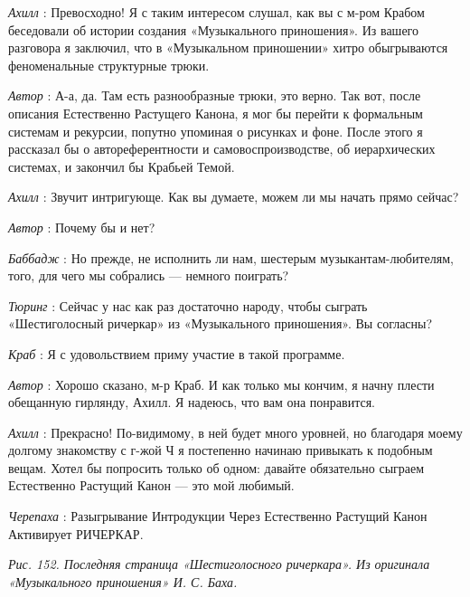 \emph{Ахилл} : Превосходно! Я с таким интересом слушал, как вы с м-ром Крабом беседовали об истории создания «Музыкального приношения». Из вашего разговора я заключил, что в «Музыкальном приношении» хитро обыгрываются феноменальные структурные трюки.

\emph{Автор} : А-а, да. Там есть разнообразные трюки, это верно. Так вот, после описания Естественно Растущего Канона, я мог бы перейти к формальным системам и рекурсии, попутно упоминая о рисунках и фоне. После этого я рассказал бы о автореферентности и самовоспроизводстве, об иерархических системах, и закончил бы Крабьей Темой.

\emph{Ахилл} : Звучит интригующе. Как вы думаете, можем ли мы начать прямо сейчас?

\emph{Автор} : Почему бы и нет?

\emph{Баббадж} : Но прежде, не исполнить ли нам, шестерым музыкантам-любителям, того, для чего мы собрались --- немного поиграть?

\emph{Тюринг} : Сейчас у нас как раз достаточно народу, чтобы сыграть «Шестиголосный ричеркар» из «Музыкального приношения». Вы согласны?

\emph{Краб} : Я с удовольствием приму участие в такой программе.

\emph{Автор} : Хорошо сказано, м-р Краб. И как только мы кончим, я начну плести обещанную гирлянду, Ахилл. Я надеюсь, что вам она понравится.

\emph{Ахилл} : Прекрасно! По-видимому, в ней будет много уровней, но благодаря моему долгому знакомству с г-жой Ч я постепенно начинаю привыкать к подобным вещам. Хотел бы попросить только об одном: давайте обязательно сыграем Естественно Растущий Канон --- это мой любимый.

\emph{Черепаха} : Разыгрывание Интродукции Через Естественно Растущий Канон Активирует РИЧЕРКАР.

\emph{Рис. 152. Последняя страница «Шестиголосного ричеркара». Из оригинала «Музыкального приношения» И. С. Баха.}


